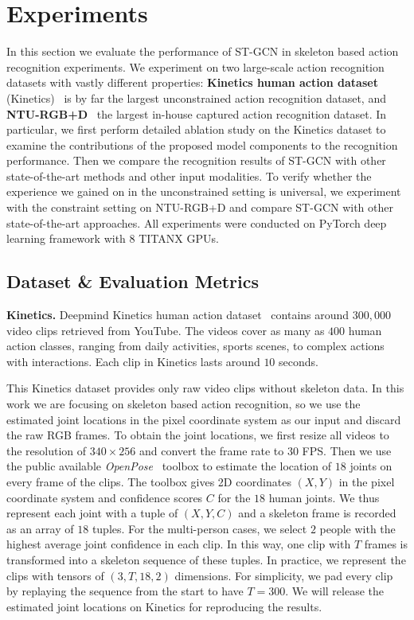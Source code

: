 \documentclass[letterpaper]{article} %
\begin{document}
\section{Experiments}

In this section we evaluate the performance of ST-GCN in skeleton based action recognition experiments.
We experiment on two large-scale action recognition datasets with vastly different properties: \textbf{Kinetics human action dataset} (Kinetics)~\cite{Kay2017Kinetics} is by far the largest unconstrained action recognition dataset, and \textbf{NTU-RGB+D}~\cite{Shahroudy2016CVPR} the largest in-house captured action recognition dataset.
In particular, we first perform detailed ablation study on the Kinetics dataset to examine the contributions of the proposed model components to the recognition performance.
Then we compare the recognition results of ST-GCN with other state-of-the-art methods and other input modalities.
To verify whether the experience we gained on in the unconstrained setting is universal, we experiment with the constraint setting on NTU-RGB+D and compare ST-GCN with other state-of-the-art approaches.
All experiments were conducted on PyTorch deep learning framework with 8 TITANX GPUs.



\subsection{Dataset \& Evaluation Metrics}
\textbf{Kinetics.}
Deepmind Kinetics human action dataset~\cite{Kay2017Kinetics} contains around $300,000$ video clips retrieved from YouTube.
The videos cover as many as $400$ human action classes, ranging from daily activities, sports scenes, to complex actions with interactions.
Each clip in Kinetics lasts around $10$ seconds.

This Kinetics dataset provides only raw video clips without skeleton data.
In this work we are focusing on skeleton based action recognition, so we use the estimated joint locations in the pixel coordinate system as our input and discard the raw RGB frames.
To obtain the joint locations, we first resize all videos to the resolution of $340 \times 256$ and convert the frame rate to $30$ FPS. Then we use the public available \emph{OpenPose}~\cite{Cao2017Openpose} toolbox to estimate the location of $ 18 $ joints on every frame of the clips.
The toolbox gives 2D coordinates $(X, Y)$ in the pixel coordinate system and confidence scores $C$ for the $18$ human joints.
We thus represent each joint with a tuple of $(X, Y, C)$ and a skeleton frame is recorded as an array of $ 18 $ tuples.
For the multi-person cases, we select $2$ people with the highest average joint confidence in each clip.
In this way, one clip with $ T $ frames is transformed into a skeleton sequence of these tuples.
In practice, we represent the clips with tensors of $ (3, T, 18, 2) $ dimensions.
For simplicity, we pad every clip by replaying the sequence from the start to have $ T=300 $.
We will release the estimated joint locations on Kinetics for reproducing the results.
\end{document}
